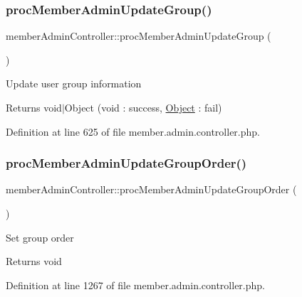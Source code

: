 \mbox{\label{classmemberAdminController_a8d14fe0f7df63dbce5cc50d61d452635}} 
\subsubsection{\texorpdfstring{proc\+Member\+Admin\+Update\+Group()}{procMemberAdminUpdateGroup()}}
{\footnotesize\ttfamily member\+Admin\+Controller\+::proc\+Member\+Admin\+Update\+Group (\begin{DoxyParamCaption}{ }\end{DoxyParamCaption})}

Update user group information \begin{DoxyReturn}{Returns}
void$\vert$\+Object (void \+: success, \hyperlink{classObject}{Object} \+: fail) 
\end{DoxyReturn}


Definition at line 625 of file member.\+admin.\+controller.\+php.

\mbox{\label{classmemberAdminController_abadf39e3363281d5b04444aec0801a2b}} 
\subsubsection{\texorpdfstring{proc\+Member\+Admin\+Update\+Group\+Order()}{procMemberAdminUpdateGroupOrder()}}
{\footnotesize\ttfamily member\+Admin\+Controller\+::proc\+Member\+Admin\+Update\+Group\+Order (\begin{DoxyParamCaption}{ }\end{DoxyParamCaption})}

Set group order \begin{DoxyReturn}{Returns}
void 
\end{DoxyReturn}


Definition at line 1267 of file member.\+admin.\+controller.\+php.

